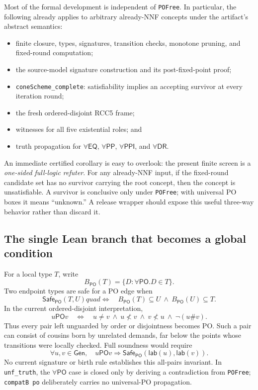 \documentclass[11pt]{article}
\newcommand{\PP}{\mathsf{PP}}
\newcommand{\PPI}{\mathsf{PPI}}
\newcommand{\PO}{\mathsf{PO}}
\newcommand{\DR}{\mathsf{DR}}
\newcommand{\EQ}{\mathsf{EQ}}
\newcommand{\code}[1]{\texttt{#1}}
\begin{document}
Most of the formal development is independent of \code{POFree}. In particular, the
following already applies to arbitrary already-NNF concepts under the artifact's
abstract semantics:
\begin{itemize}
  \item finite closure, types, signatures, transition checks, monotone pruning, and
  fixed-round computation;
  \item the source-model signature construction and its post-fixed-point proof;
  \item \code{coneScheme\_complete}: satisfiability implies an accepting survivor at
  every iteration round;
  \item the fresh ordered-disjoint RCC5 frame;
  \item witnesses for all five existential roles; and
  \item truth propagation for $\forall\EQ$, $\forall\PP$, $\forall\PPI$, and
  $\forall\DR$.
\end{itemize}

An immediate certified corollary is easy to overlook: the present finite screen is a
\emph{one-sided full-logic refuter}. For any already-NNF input, if the fixed-round
candidate set has no survivor carrying the root concept, then the concept is
unsatisfiable. A survivor is conclusive only under \code{POFree}; with universal PO
boxes it means ``unknown.'' A release wrapper should expose this useful three-way
behavior rather than discard it.

\subsection{The single Lean branch that becomes a global condition}

For a local type $T$, write
\[
  B_{\PO}(T)=\{D:\forall\PO.D\in T\}.
\]
Two endpoint types are safe for a PO edge when
\[
  \mathsf{Safe}_{\PO}(T,U)quad\Longleftrightarrow\quad
  B_{\PO}(T)\subseteq U\ \land\ B_{\PO}(U)\subseteq T.
\]
In the current ordered-disjoint interpretation,
\[
 u\mathrel{\PO}v
 \quad\Longleftrightarrow\quad
 u\neq v\ \land\ u\not< v\ \land\ v\not< u\ \land\ \neg(u\#v).
\]
Thus every pair left unguarded by order or disjointness becomes PO. Such a pair can
consist of cousins born by unrelated demands, far below the points whose transitions
were locally checked. Full soundness would require
\[
  \forall u,v\in\mathsf{Gen},\quad
  u\mathrel{\PO}v\Longrightarrow
  \mathsf{Safe}_{\PO}(\mathsf{lab}(u),\mathsf{lab}(v)).
  \tag{PO-Hintikka}
\]
No current signature or birth rule establishes this all-pairs invariant. In
\code{unf\_truth}, the $\forall\PO$ case is closed only by deriving a contradiction
from \code{POFree}; \code{compatB po} deliberately carries no universal-PO
propagation.
\end{document}
